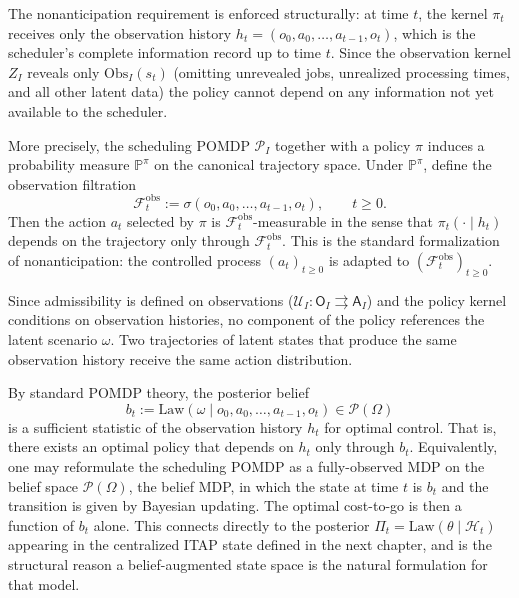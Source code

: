 \begin{remark}
The nonanticipation requirement is enforced structurally: at time $t$, the kernel
$\pi_t$ receives only the observation history
$h_t = (o_0, a_0, \ldots, a_{t-1}, o_t)$, which is the scheduler's complete
information record up to time $t$. Since the observation kernel $Z_I$ reveals only
$\mathrm{Obs}_I(s_t)$ (omitting unrevealed jobs, unrealized processing times, and
all other latent data) the policy cannot depend on any information not yet available
to the scheduler.

More precisely, the scheduling POMDP $\mathcal{P}_I$ together with a policy $\pi$
induces a probability measure $\mathbb{P}^{\pi}$ on the canonical trajectory space.
Under $\mathbb{P}^{\pi}$, define the observation filtration
\[
\mathcal{F}_t^{\mathrm{obs}} := \sigma(o_0, a_0, \ldots, a_{t-1}, o_t),
\qquad t \ge 0.
\]
Then the action $a_t$ selected by $\pi$ is $\mathcal{F}_t^{\mathrm{obs}}$-measurable
in the sense that $\pi_t(\cdot \mid h_t)$ depends on the trajectory only through
$\mathcal{F}_t^{\mathrm{obs}}$. This is the standard formalization of nonanticipation:
the controlled process $(a_t)_{t \ge 0}$ is adapted to
$(\mathcal{F}_t^{\mathrm{obs}})_{t \ge 0}$.
\end{remark}

\begin{remark}
Since admissibility is defined on observations
($\mathcal{U}_I : \mathsf{O}_I \rightrightarrows \mathsf{A}_I$) and the policy kernel
conditions on observation histories, no component of the policy references the latent
scenario $\omega$. Two trajectories of latent states that produce the same observation
history receive the same action distribution.
\end{remark}

\begin{remark}\label{rmk:belief}
By standard POMDP theory, the posterior belief
\[
b_t := \mathrm{Law}(\omega \mid o_0, a_0, \ldots, a_{t-1}, o_t)
\in \mathcal{P}(\Omega)
\]
is a sufficient statistic of the observation history $h_t$ for optimal control. That is,
there exists an optimal policy that depends on $h_t$ only through $b_t$. Equivalently,
one may reformulate the scheduling POMDP as a fully-observed MDP on the belief space
$\mathcal{P}(\Omega)$, the belief MDP, in which the state at time $t$ is $b_t$
and the transition is given by Bayesian updating. The optimal cost-to-go is then a
function of $b_t$ alone. This connects directly to the posterior
$\Pi_t = \mathrm{Law}(\theta \mid \mathcal{H}_t)$ appearing in the centralized ITAP state defined in the next chapter, and is the structural reason a belief-augmented state space is the natural formulation for that model.
\end{remark}

